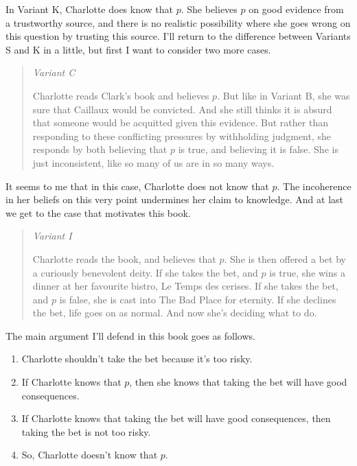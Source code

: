 \documentclass[11pt,]{book}
\providecommand{\tightlist}{%
  \setlength{\itemsep}{0pt}\setlength{\parskip}{0pt}}
\begin{document}
In Variant K, Charlotte does know that \(p\). She believes \(p\) on good evidence from a trustworthy source, and there is no realistic possibility where she goes wrong on this question by trusting this source. I'll return to the difference between Variants S and K in a little, but first I want to consider two more cases.

\begin{quote}
\emph{Variant C}

Charlotte reads Clark's book and believes \(p\). But like in Variant B, she was sure that Caillaux would be convicted. And she still thinks it is absurd that someone would be acquitted given this evidence. But rather than responding to these conflicting pressures by withholding judgment, she responds by both believing that \(p\) is true, and believing it is false. She is just inconsistent, like so many of us are in so many ways.
\end{quote}

It seems to me that in this case, Charlotte does not know that \(p\). The incoherence in her beliefs on this very point undermines her claim to knowledge. And at last we get to the case that motivates this book.

\begin{quote}
\emph{Variant I}

Charlotte reads the book, and believes that \(p\). She is then offered a bet by a curiously benevolent deity. If she takes the bet, and \(p\) is true, she wins a dinner at her favourite bistro, Le Temps des cerises. If she takes the bet, and \(p\) is false, she is cast into The Bad Place for eternity. If she declines the bet, life goes on as normal. And now she's deciding what to do.
\end{quote}

The main argument I'll defend in this book goes as follows.

\begin{enumerate}
\def\labelenumi{\arabic{enumi}.}
\tightlist
\item
  Charlotte shouldn't take the bet because it's too risky.
\item
  If Charlotte knows that \(p\), then she knows that taking the bet will have good consequences.
\item
  If Charlotte knows that taking the bet will have good consequences, then taking the bet is not too risky.
\item
  So, Charlotte doesn't know that \(p\).
\end{enumerate}
\end{document}
